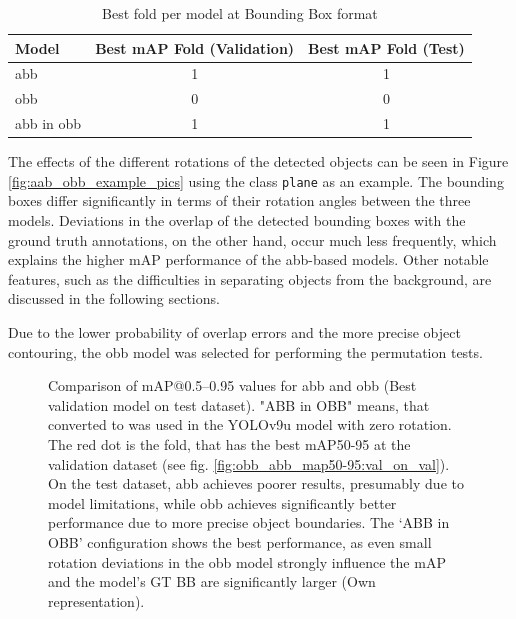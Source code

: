 \begin{table}[h]
\centering
\begin{tabular}{l c c}
\hline
\textbf{Model} & \textbf{Best mAP Fold (Validation)} & \textbf{Best mAP Fold (Test)} \\ 
\hline
abb &  1 & 1 \\
obb &  0 & 0 \\
abb in obb &  1 & 1 \\
\hline
\end{tabular}
\caption{Best fold per model at Bounding Box format}
\label{tab:best_folds_area}
\end{table}


The effects of the different rotations of the detected objects can be seen in Figure \ref{fig:aab_obb_example_pics} using the class \texttt{plane} as an example. The bounding boxes differ significantly in terms of their rotation angles between the three models. Deviations in the overlap of the detected bounding boxes with the ground truth annotations, on the other hand, occur much less frequently, which explains the higher \acrshort{mAP} performance of the \acrshort{abb}-based models. Other notable features, such as the difficulties in separating objects from the background, are discussed in the following sections.

Due to the lower probability of overlap errors and the more precise object contouring, the \acrshort{obb} model was selected for performing the permutation tests.


\begin{figure}[htbp]
    \centering
    
    \caption[Comparison of \acrshort{mAP}@0.5--0.95 values for \acrshort{abb} and \acrshort{obb} (Best validation model on test dataset)]{Comparison of \acrshort{mAP}@0.5--0.95 values for \acrshort{abb} and \acrshort{obb} (Best validation model on test dataset). "ABB in OBB" means, that  converted to  was used in the \acrshort{YOLO}v9u model with zero rotation. The red dot is the fold, that has the best \acrshort{mAP}50-95 at the validation dataset (see fig. \ref{fig:obb_abb_map50-95:val_on_val}).  On the test dataset, \acrshort{abb} achieves poorer results, presumably due to model limitations, while \acrshort{obb} achieves significantly better performance due to more precise object boundaries. The ‘ABB in OBB’ configuration shows the best performance, as even small rotation deviations in the \acrshort{obb} model strongly influence the \acrshort{mAP} and the model's \acrshort{GT} \acrshort{BB} are significantly larger (Own representation). }
    \label{fig:obb_abb_map50-95:val_on_test}
\end{figure}

